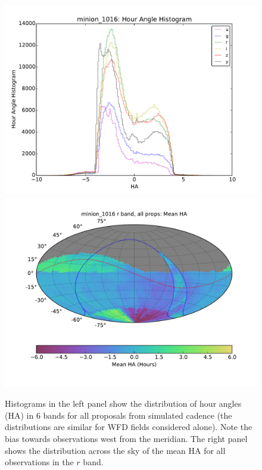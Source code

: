 \begin{figure}[t!]
\vskip -0.0in
\includegraphics[angle=0,width=0.49\hsize,clip]{figs/cadence/minion_1016_Hour_Angle_Histogram_u_g_r_i_z_y_band_all_props_ONED_ComboBinnedData.pdf}
\includegraphics[angle=0,width=0.49\hsize,clip]{figs/cadence/minion_1016_Mean_HA_r_band_all_props_OPSI_SkyMap.pdf}
\vskip -0.1in
\caption{Histograms in the left panel show the distribution of hour angles (HA) in
6 bands for all proposals from simulated cadence  (the distributions are
similar for WFD fields considered alone). Note the bias towards observations west from
the meridian. The right panel shows the distribution across the sky of the mean HA for
all observations in the $r$ band. }
\label{fig:HAenigma}
\end{figure}

